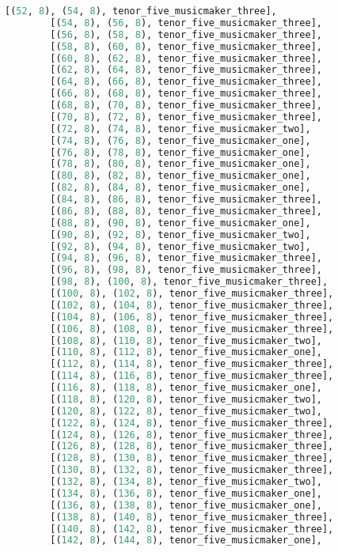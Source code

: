 \begin{lstlisting}[language=Python, caption=Invocation Source Code]
        [(52, 8), (54, 8), tenor_five_musicmaker_three],
        [(54, 8), (56, 8), tenor_five_musicmaker_three],
        [(56, 8), (58, 8), tenor_five_musicmaker_three],
        [(58, 8), (60, 8), tenor_five_musicmaker_three],
        [(60, 8), (62, 8), tenor_five_musicmaker_three],
        [(62, 8), (64, 8), tenor_five_musicmaker_three],
        [(64, 8), (66, 8), tenor_five_musicmaker_three],
        [(66, 8), (68, 8), tenor_five_musicmaker_three],
        [(68, 8), (70, 8), tenor_five_musicmaker_three],
        [(70, 8), (72, 8), tenor_five_musicmaker_three],
        [(72, 8), (74, 8), tenor_five_musicmaker_two],
        [(74, 8), (76, 8), tenor_five_musicmaker_one],
        [(76, 8), (78, 8), tenor_five_musicmaker_one],
        [(78, 8), (80, 8), tenor_five_musicmaker_one],
        [(80, 8), (82, 8), tenor_five_musicmaker_one],
        [(82, 8), (84, 8), tenor_five_musicmaker_one],
        [(84, 8), (86, 8), tenor_five_musicmaker_three],
        [(86, 8), (88, 8), tenor_five_musicmaker_three],
        [(88, 8), (90, 8), tenor_five_musicmaker_one],
        [(90, 8), (92, 8), tenor_five_musicmaker_two],
        [(92, 8), (94, 8), tenor_five_musicmaker_two],
        [(94, 8), (96, 8), tenor_five_musicmaker_three],
        [(96, 8), (98, 8), tenor_five_musicmaker_three],
        [(98, 8), (100, 8), tenor_five_musicmaker_three],
        [(100, 8), (102, 8), tenor_five_musicmaker_three],
        [(102, 8), (104, 8), tenor_five_musicmaker_three],
        [(104, 8), (106, 8), tenor_five_musicmaker_three],
        [(106, 8), (108, 8), tenor_five_musicmaker_three],
        [(108, 8), (110, 8), tenor_five_musicmaker_two],
        [(110, 8), (112, 8), tenor_five_musicmaker_one],
        [(112, 8), (114, 8), tenor_five_musicmaker_three],
        [(114, 8), (116, 8), tenor_five_musicmaker_three],
        [(116, 8), (118, 8), tenor_five_musicmaker_one],
        [(118, 8), (120, 8), tenor_five_musicmaker_two],
        [(120, 8), (122, 8), tenor_five_musicmaker_two],
        [(122, 8), (124, 8), tenor_five_musicmaker_three],
        [(124, 8), (126, 8), tenor_five_musicmaker_three],
        [(126, 8), (128, 8), tenor_five_musicmaker_three],
        [(128, 8), (130, 8), tenor_five_musicmaker_three],
        [(130, 8), (132, 8), tenor_five_musicmaker_three],
        [(132, 8), (134, 8), tenor_five_musicmaker_two],
        [(134, 8), (136, 8), tenor_five_musicmaker_one],
        [(136, 8), (138, 8), tenor_five_musicmaker_one],
        [(138, 8), (140, 8), tenor_five_musicmaker_three],
        [(140, 8), (142, 8), tenor_five_musicmaker_three],
        [(142, 8), (144, 8), tenor_five_musicmaker_one],

\end{lstlisting}
